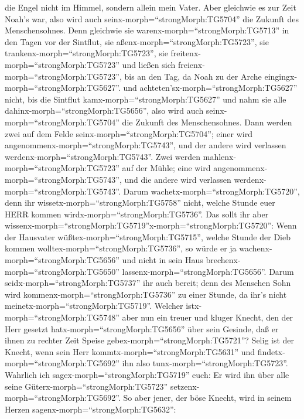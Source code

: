 die Engel nicht im Himmel, sondern allein mein Vater.  Aber
gleichwie es zur Zeit Noah's war, also wird auch
seinx-morph=``strongMorph:TG5704'' die Zukunft des Menschensohnes.
 Denn gleichwie sie warenx-morph=``strongMorph:TG5713'' in
den Tagen vor der Sintflut, sie aßenx-morph=``strongMorph:TG5723'', sie
trankenx-morph=``strongMorph:TG5723'', sie
freitenx-morph=``strongMorph:TG5723'' und ließen sich
freienx-morph=``strongMorph:TG5723'', bis an den Tag, da Noah zu der
Arche eingingx-morph=``strongMorph:TG5627''.  und
achteten'sx-morph=``strongMorph:TG5627'' nicht, bis die Sintflut
kamx-morph=``strongMorph:TG5627'' und nahm sie alle
dahinx-morph=``strongMorph:TG5656'', also wird auch
seinx-morph=``strongMorph:TG5704'' die Zukunft des Menschensohnes.
 Dann werden zwei auf dem Felde
seinx-morph=``strongMorph:TG5704''; einer wird
angenommenx-morph=``strongMorph:TG5743'', und der andere wird verlassen
werdenx-morph=``strongMorph:TG5743''.  Zwei werden
mahlenx-morph=``strongMorph:TG5723'' auf der Mühle; eine wird
angenommenx-morph=``strongMorph:TG5743'', und die andere wird verlassen
werdenx-morph=``strongMorph:TG5743''.  Darum
wachetx-morph=``strongMorph:TG5720'', denn ihr
wissetx-morph=``strongMorph:TG5758'' nicht, welche Stunde euer HERR
kommen wirdx-morph=``strongMorph:TG5736''.  Das sollt ihr
aber
wissenx-morph=``strongMorph:TG5719''\textbar x-morph=``strongMorph:TG5720'':
Wenn der Hausvater wüßtex-morph=``strongMorph:TG5715'', welche Stunde
der Dieb kommen wolltex-morph=``strongMorph:TG5736'', so würde er ja
wachenx-morph=``strongMorph:TG5656'' und nicht in sein Haus
brechenx-morph=``strongMorph:TG5650''
lassenx-morph=``strongMorph:TG5656''.  Darum
seidx-morph=``strongMorph:TG5737'' ihr auch bereit; denn des Menschen
Sohn wird kommenx-morph=``strongMorph:TG5736'' zu einer Stunde, da ihr's
nicht meinetx-morph=``strongMorph:TG5719''.  Welcher
istx-morph=``strongMorph:TG5748'' aber nun ein treuer und kluger Knecht,
den der Herr gesetzt hatx-morph=``strongMorph:TG5656'' über sein
Gesinde, daß er ihnen zu rechter Zeit Speise
gebex-morph=``strongMorph:TG5721''?  Selig ist der Knecht,
wenn sein Herr kommtx-morph=``strongMorph:TG5631'' und
findetx-morph=``strongMorph:TG5692'' ihn also
tunx-morph=``strongMorph:TG5723''.  Wahrlich ich
sagex-morph=``strongMorph:TG5719'' euch: Er wird ihn über alle seine
Güterx-morph=``strongMorph:TG5723''
setzenx-morph=``strongMorph:TG5692''.  So aber jener, der
böse Knecht, wird in seinem Herzen sagenx-morph=``strongMorph:TG5632'':
